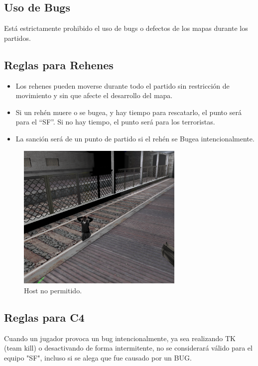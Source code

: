 \documentclass[a4paper, 11pt]{article}
\begin{document}
    \subsection{Uso de Bugs}
    Está estrictamente prohibido el uso de bugs o defectos de los mapas durante los partidos.

    \subsection{Reglas para Rehenes}

    \begin{itemize}
        \item Los rehenes pueden moverse durante todo el partido sin restricción de movimiento y sin que afecte el desarrollo del mapa.
        \item Si un rehén muere o se bugea, y hay tiempo para rescatarlo, el punto será para el “SF”. Si no hay tiempo, el punto será para los terroristas.
        \item La sanción será de un punto de partido si el rehén se Bugea intencionalmente.
    \end{itemize}

    
    \begin{figure}[htb]
        \centering
        \includegraphics[width=8cm]{img/host_bug.png}
        \caption{Host no permitido.}
    \end{figure} 

    \subsection{Reglas para C4}

    Cuando un jugador provoca un bug intencionalmente, ya sea realizando TK (team kill) o desactivando de forma intermitente, no se considerará válido para el equipo "SF", incluso si se alega que fue causado por un BUG. 
    
\end{document}
